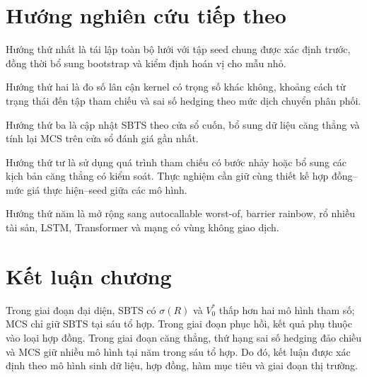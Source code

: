 \section{Hướng nghiên cứu tiếp theo}
\label{sec:c5-future}

Hướng thứ nhất là tái lập toàn bộ lưới với tập seed chung được xác định trước,
đồng thời bổ sung bootstrap và kiểm định hoán vị cho mẫu nhỏ.

Hướng thứ hai là đo số lân cận kernel có trọng số khác không, khoảng cách từ
trạng thái đến tập tham chiếu và sai số hedging theo mức dịch chuyển phân
phối.

Hướng thứ ba là cập nhật SBTS theo cửa sổ cuốn, bổ sung dữ liệu căng thẳng và
tính lại MCS trên cửa sổ đánh giá gần nhất.

Hướng thứ tư là sử dụng quá trình tham chiếu có bước nhảy hoặc bổ sung các kịch
bản căng thẳng có kiểm soát. Thực nghiệm cần giữ cùng thiết kế hợp đồng--mức
giá thực hiện--seed giữa các mô hình.

Hướng thứ năm là mở rộng sang autocallable worst-of, barrier rainbow, rổ nhiều
tài sản, LSTM, Transformer và mạng có vùng không giao dịch.

\section{Kết luận chương}

Trong giai đoạn đại diện, SBTS có $\sigma(R)$ và $V_0^{*}$ thấp hơn hai mô hình tham số;
MCS chỉ giữ SBTS tại sáu tổ hợp. Trong giai đoạn phục hồi, kết quả phụ thuộc vào loại
hợp đồng. Trong giai đoạn căng thẳng, thứ hạng sai số hedging đảo chiều và MCS giữ nhiều mô
hình tại năm trong sáu tổ hợp. Do đó, kết luận được xác định theo mô hình sinh
dữ liệu, hợp đồng, hàm mục tiêu và giai đoạn thị trường.
